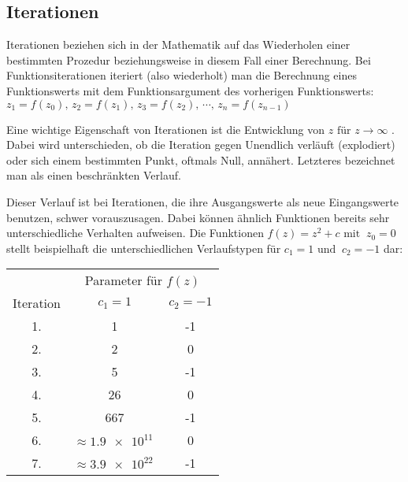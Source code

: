 \subsection{Iterationen}\label{subsec:iterations}

Iterationen beziehen sich in der Mathematik auf das Wiederholen einer bestimmten
Prozedur beziehungsweise in diesem Fall einer Berechnung.
Bei Funktionsiterationen iteriert (also wiederholt) man die Berechnung eines
Funktionswerts mit dem Funktionsargument des vorherigen Funktionswerts:
\(z_1 = f(z_0),\, z_2 = f(z_1),\, z_3 = f(z_2),\, \cdots,\, z_n = f(z_{n-1})\)

Eine wichtige Eigenschaft von
Iterationen ist die Entwicklung von \(z \text{ für } z \to \infty\) .
Dabei wird unterschieden, ob die Iteration gegen Unendlich verläuft
(\glqq explodiert\grqq ) oder sich einem bestimmten Punkt, oftmals Null, ann\"ahert.
Letzteres bezeichnet man als einen beschränkten Verlauf.

Dieser Verlauf ist bei Iterationen, die ihre Ausgangswerte als neue Eingangswerte
benutzen, schwer vorauszusagen.
Dabei k\"onnen \"ahnlich Funktionen bereits sehr unterschiedliche Verhalten aufweisen.
Die Funktionen \(f(z) = z^2 + c \text{ mit }\ z_0 = 0\) stellt beispielhaft
die unterschiedlichen Verlaufstypen für \(c_1 = 1 \text{ und }\ c_2 = -1\) dar:

\begin{table}[h!]\label{tab:iterations-example}
  \centering
  \begin{tabular}{@{}ccc@{}}
    \toprule
    & \multicolumn{2}{c}{Parameter für \(f(z)\)} \\
    \cmidrule(lr){2-3}
    Iteration & \( c_1 = 1\) & \( c_2 = -1\) \\
    \midrule
    1. & 1 & -1 \\
    2. & 2 & 0 \\
    3. & 5 & -1 \\
    4. & 26 & 0 \\
    5. & 667 & -1 \\
    6. & \(\approx \num{1,9e11}\ \) & 0 \\
    7. & \(\approx \num{3,9e22}\ \) & -1 \\
    \bottomrule
  \end{tabular}
\end{table}